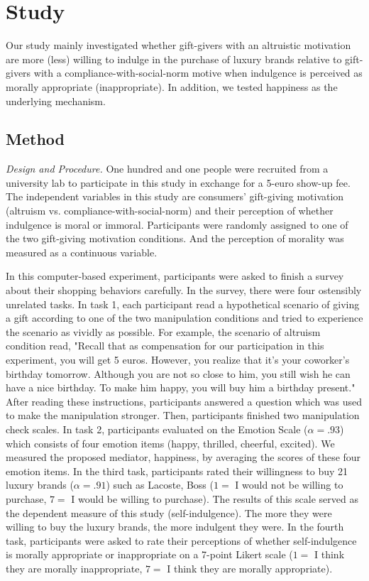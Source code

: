 \documentclass[11pt, a4paper, leqno]{article}
\begin{document}
\section{Study}
\label{sec:study}

\setlength{\parindent}{2ex}
Our study mainly investigated whether gift-givers with an altruistic motivation are more (less) willing to indulge in the purchase of luxury brands relative to gift-givers with a compliance-with-social-norm motive when indulgence is perceived as morally appropriate (inappropriate). In addition, we tested happiness as the underlying mechanism. \par

\subsection{Method}

\setlength{\parindent}{2ex}
\emph{Design and Procedure.} One hundred and one people were recruited from a university lab to participate in this study in exchange for a 5-euro show-up fee. The independent variables in this study are consumers' gift-giving motivation (altruism vs. compliance-with-social-norm) and their perception of whether indulgence is moral or immoral. Participants were randomly assigned to one of the two gift-giving motivation conditions. And the perception of morality was measured as a continuous variable. \par
In this computer-based experiment, participants were asked to finish a survey about their shopping behaviors carefully. In the survey, there were four ostensibly unrelated tasks. In task 1, each participant read a hypothetical scenario of giving a gift according to one of the two manipulation conditions and tried to experience the scenario as vividly as possible. For example, the scenario of altruism condition read, "Recall that as compensation for our participation in this experiment, you will get 5 euros. However, you realize that it's your coworker's birthday tomorrow. Although you are not so close to him, you still wish he can have a nice birthday. To make him happy, you will buy him a birthday present." After reading these instructions, participants answered a question which was used to make the manipulation stronger. Then, participants finished two manipulation check scales. In task 2, participants evaluated on the Emotion Scale ($\alpha= .93$) which consists of four emotion items (happy, thrilled, cheerful, excited). We measured the proposed mediator, happiness, by averaging the scores of these four emotion items. In the third task, participants rated their willingness to buy 21 luxury brands ($\alpha= .91$) such as Lacoste, Boss ($1=$ I would not be willing to purchase, $7=$ I would be willing to purchase). The results of this scale served as the dependent measure of this study (self-indulgence). The more they were willing to buy the luxury brands, the more indulgent they were. In the fourth task, participants were asked to rate their perceptions of whether self-indulgence is morally appropriate or inappropriate on a 7-point Likert scale ($1=$ I think they are morally inappropriate, $7=$ I think they are morally appropriate). \par
\end{document}
